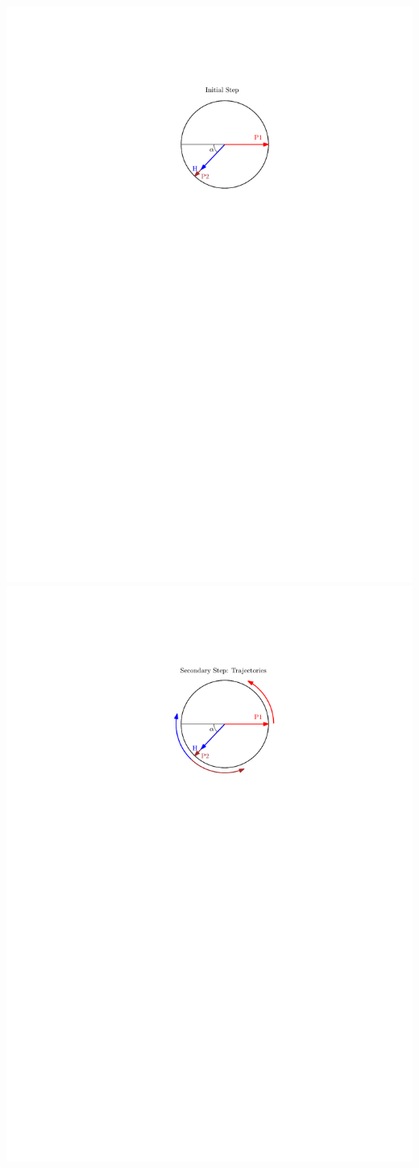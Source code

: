 \documentclass[11pt]{amsart}
\begin{document}
\includegraphics{mypics/2Q1S_Initial.pdf}
\includegraphics{mypics/2Q1S_Second_Step.pdf}
\end{document}
